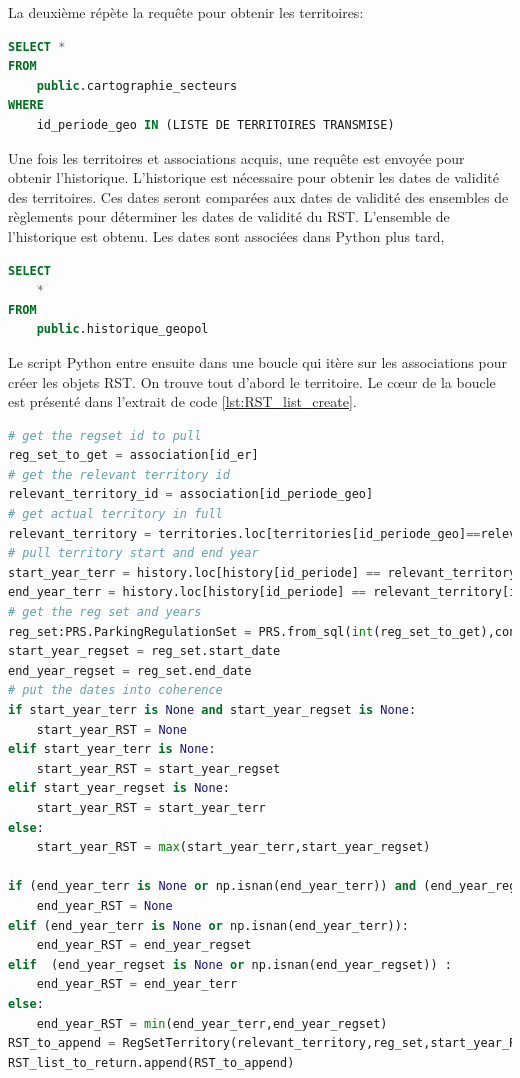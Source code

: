         La deuxième répète la requête pour obtenir les territoires:
\begin{lstlisting}[language=SQL, caption=Sélection des territoires pertinents]
SELECT *
FROM 
    public.cartographie_secteurs
WHERE
    id_periode_geo IN (LISTE DE TERRITOIRES TRANSMISE)\end{lstlisting}
        Une fois les territoires et associations acquis, une requête est envoyée pour obtenir l'historique. L'historique est nécessaire pour obtenir les dates de validité des territoires. Ces dates seront comparées aux dates de validité des ensembles de règlements pour déterminer les dates de validité du \ac{RST}. L'ensemble de l'historique est obtenu. Les dates sont associées dans Python plus tard,
\begin{lstlisting}[language=SQL, caption=Sélection des entêtes d'ensembles de règlemements]
SELECT 
    *
FROM
    public.historique_geopol
\end{lstlisting}        
        Le script Python entre ensuite dans une boucle qui itère sur les associations pour créer les objets \ac{RST}. On trouve tout d'abord le territoire. Le cœur de la boucle est présenté dans l'extrait de code \ref{lst:RST_list_create}.
\begin{lstlisting}[language=Python, caption=Coeur de la boucle pour créer la liste de RST, label=lst:RST_list_create] 
 # get the regset id to pull
reg_set_to_get = association[id_er]
# get the relevant territory id
relevant_territory_id = association[id_periode_geo]
# get actual territory in full
relevant_territory = territories.loc[territories[id_periode_geo]==relevant_territory_id]
# pull territory start and end year
start_year_terr = history.loc[history[id_periode] == relevant_territory[id_periode].values[0],annee_debut_periode].values[0]
end_year_terr = history.loc[history[id_periode] == relevant_territory[id_periode].values[0],annee_fin_periode].values[0]
# get the reg set and years
reg_set:PRS.ParkingRegulationSet = PRS.from_sql(int(reg_set_to_get),con=con)[0]
start_year_regset = reg_set.start_date
end_year_regset = reg_set.end_date
# put the dates into coherence
if start_year_terr is None and start_year_regset is None:
    start_year_RST = None
elif start_year_terr is None:
    start_year_RST = start_year_regset
elif start_year_regset is None:
    start_year_RST = start_year_terr
else:
    start_year_RST = max(start_year_terr,start_year_regset)

if (end_year_terr is None or np.isnan(end_year_terr)) and (end_year_regset is None or np.isnan(end_year_regset)):
    end_year_RST = None
elif (end_year_terr is None or np.isnan(end_year_terr)):
    end_year_RST = end_year_regset
elif  (end_year_regset is None or np.isnan(end_year_regset)) :
    end_year_RST = end_year_terr
else:
    end_year_RST = min(end_year_terr,end_year_regset)
RST_to_append = RegSetTerritory(relevant_territory,reg_set,start_year_RST,end_year_RST,association[id_assoc_er_ter])
RST_list_to_return.append(RST_to_append)   
\end{lstlisting}
